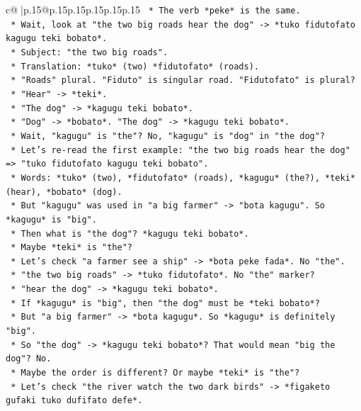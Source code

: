 \documentclass{article}
\begin{document}
{\begin{supertabular}{c@{$\;$}|p{.15\linewidth}@{}p{.15\linewidth}p{.15\linewidth}p{.15\linewidth}p{.15\linewidth}p{.15\linewidth}}
{{{\texttt{        *   The verb *peke* is the same.} \\
\texttt{    *   Wait, look at "the two big roads hear the dog" {-}> *tuko fidutofato kagugu teki bobato*.} \\
\texttt{        *   Subject: "the two big roads".} \\
\texttt{        *   Translation: *tuko* (two) *fidutofato* (roads).} \\
\texttt{        *   "Roads" plural. "Fiduto" is singular road. "Fidutofato" is plural?} \\
\texttt{        *   "Hear" {-}> *teki*.} \\
\texttt{        *   "The dog" {-}> *kagugu teki bobato*.} \\
\texttt{        *   "Dog" {-}> *bobato*. "The dog" {-}> *kagugu teki bobato*.} \\
\texttt{        *   Wait, "kagugu" is "the"? No, "kagugu" is "dog" in "the dog"?} \\
\texttt{        *   Let's re{-}read the first example: "the two big roads hear the dog" => "tuko fidutofato kagugu teki bobato".} \\
\texttt{        *   Words: *tuko* (two), *fidutofato* (roads), *kagugu* (the?), *teki* (hear), *bobato* (dog).} \\
\texttt{        *   But "kagugu" was used in "a big farmer" {-}> "bota kagugu". So *kagugu* is "big".} \\
\texttt{        *   Then what is "the dog"? *kagugu teki bobato*.} \\
\texttt{        *   Maybe *teki* is "the"?} \\
\texttt{        *   Let's check "a farmer see a ship" {-}> *bota peke fada*. No "the".} \\
\texttt{        *   "the two big roads" {-}> *tuko fidutofato*. No "the" marker?} \\
\texttt{        *   "hear the dog" {-}> *kagugu teki bobato*.} \\
\texttt{        *   If *kagugu* is "big", then "the dog" must be *teki bobato*?} \\
\texttt{        *   But "a big farmer" {-}> *bota kagugu*. So *kagugu* is definitely "big".} \\
\texttt{        *   So "the dog" {-}> *kagugu teki bobato*? That would mean "big the dog"? No.} \\
\texttt{        *   Maybe the order is different? Or maybe *teki* is "the"?} \\
\texttt{        *   Let's check "the river watch the two dark birds" {-}> *figaketo gufaki tuko dufifato defe*.} \\
}}}
\end{supertabular}}
\end{document}
